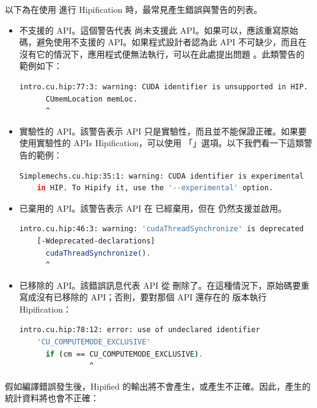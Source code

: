 以下為在使用  進行 Hipification 時，最常見產生錯誤與警告的列表。

\begin{itemize}
    \item 不支援的 API。這個警告代表  尚未支援此 API。如果可以，應該重寫原始碼，避免使用不支援的 API。如果程式設計者認為此 API 不可缺少，而且在沒有它的情況下，應用程式便無法執行，可以在此處提出問題 \cite{amd2021hip}。此類警告的範例如下：

    \begin{lstlisting}[language=bash]
    intro.cu.hip:77:3: warning: CUDA identifier is unsupported in HIP.
      CUmemLocation memLoc.
      ^
    \end{lstlisting}
    
    \item 實驗性的 API。該警告表示 API 只是實驗性，而且並不能保證正確。如果要使用實驗性的 APIs Hipification，可以使用 「」選項。以下我們看一下這類警告的範例：
    
    \begin{lstlisting}[language=bash]
    Simplemechs.cu.hip:35:1: warning: CUDA identifier is experimental
    in HIP. To Hipify it, use the '--experimental' option.
    \end{lstlisting}
    
    \item 已棄用的 API。該警告表示 API 在  已經棄用，但在  仍然支援並啟用。
    
    \begin{lstlisting}[language=bash]
    intro.cu.hip:46:3: warning: 'cudaThreadSynchronize' is deprecated
    [-Wdeprecated-declarations]
      cudaThreadSynchronize().
      ^
    \end{lstlisting}
    
    \item 已移除的 API。該錯誤訊息代表 API 從  刪除了。在這種情況下，原始碼要重寫成沒有已移除的 API；否則，要對那個 API 還存在的  版本執行 Hipification：
    
    \begin{lstlisting}[language=bash]
    intro.cu.hip:78:12: error: use of undeclared identifier
    'CU_COMPUTEMODE_EXCLUSIVE'
      if (cm == CU_COMPUTEMODE_EXCLUSIVE).
                ^
    \end{lstlisting}


\end{itemize}

假如編譯錯誤發生後，Hipified 的輸出將不會產生，或產生不正確。因此，產生的統計資料將也會不正確：

